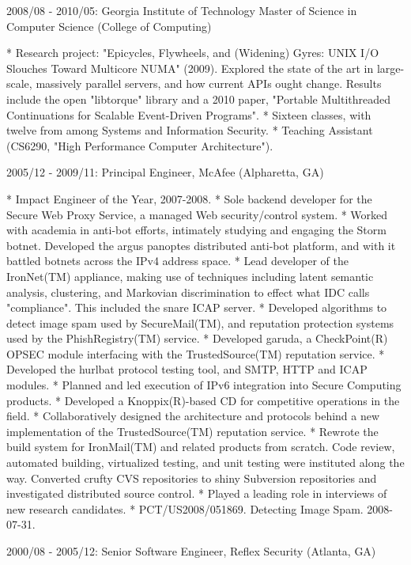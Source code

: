 2008/08 - 2010/05: Georgia Institute of Technology
Master of Science in Computer Science (College of Computing)

* Research project: "Epicycles, Flywheels, and (Widening) Gyres: UNIX I/O
  Slouches Toward Multicore NUMA" (2009). Explored the state of the art in
  large-scale, massively parallel servers, and how current APIs ought
  change. Results include the open "libtorque" library and a 2010 paper,
  "Portable Multithreaded Continuations for Scalable Event-Driven Programs".
* Sixteen classes, with twelve from among Systems and Information Security.
* Teaching Assistant (CS6290, "High Performance Computer Architecture").

2005/12 - 2009/11: Principal Engineer, McAfee (Alpharetta, GA)

* Impact Engineer of the Year, 2007-2008.
* Sole backend developer for the Secure Web Proxy Service, a managed Web
  security/control system.
* Worked with academia in anti-bot efforts, intimately studying and engaging
  the Storm botnet. Developed the argus panoptes distributed anti-bot
  platform, and with it battled botnets across the IPv4 address space.
* Lead developer of the IronNet(TM) appliance, making use of techniques
  including latent semantic analysis, clustering, and Markovian discrimination
  to effect what IDC calls "compliance". This included the snare ICAP server.
* Developed algorithms to detect image spam used by SecureMail(TM), and
  reputation protection systems used by the PhishRegistry(TM) service.
* Developed garuda, a CheckPoint(R) OPSEC module interfacing with the
  TrustedSource(TM) reputation service.
* Developed the hurlbat protocol testing tool, and SMTP, HTTP and ICAP modules.
* Planned and led execution of IPv6 integration into Secure Computing products.
* Developed a Knoppix(R)-based CD for competitive operations in the field.
* Collaboratively designed the architecture and protocols behind a new
  implementation of the TrustedSource(TM) reputation service.
* Rewrote the build system for IronMail(TM) and related products from scratch.
  Code review, automated building, virtualized testing, and unit testing were
  instituted along the way. Converted crufty CVS repositories to shiny
  Subversion repositories and investigated distributed source control.
* Played a leading role in interviews of new research candidates.
* PCT/US2008/051869. Detecting Image Spam. 2008-07-31.

2000/08 - 2005/12: Senior Software Engineer, Reflex Security (Atlanta, GA)

